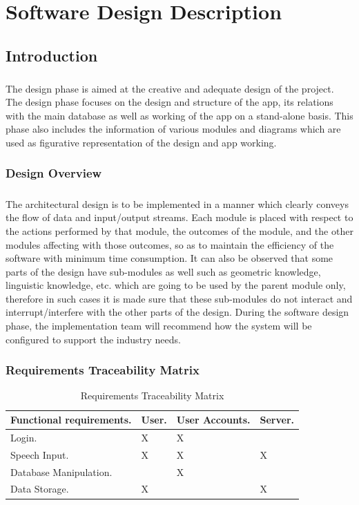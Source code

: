 \chapter{Software Design Description}
\section{Introduction}
\paragraph{}The design phase is aimed at the creative and adequate design of the project. The design phase focuses on the design and structure of the app, its relations with the main database as well as working of the app on a stand-alone basis. This phase also includes the information of various modules and diagrams which are used as figurative representation of the design and app working.
\subsection{Design Overview}\paragraph{}The architectural design is to be implemented in a manner which clearly conveys the flow of data and input/output streams. Each module is placed with respect to the actions performed by that module, the outcomes of the module, and the other modules affecting with those outcomes, so as to maintain the efficiency of the software with minimum time consumption.
It can also be observed that some parts of the design have sub-modules as well such as geometric knowledge, linguistic knowledge, etc. which are going to be used by the parent module only, therefore in such cases it is made sure that these sub-modules do not interact and interrupt/interfere with the other parts of the design. During the software design phase, the implementation team will recommend how the system will be configured to support the industry needs.
\newpage
\subsection{Requirements Traceability Matrix}
  \begin{center}
\begin{table}[h!]
\caption{Requirements Traceability Matrix}
  \centering
  \begin{tabular}{|p{3cm}| p{1.5cm} | p{1.5cm} | p{1.5cm}|}
\hline
    Functional requirements. & User.& User Accounts. & Server.\\
    \hline
    
    Login. &X&X&\\
 \hline
    Speech Input. &X&X&X\\
 \hline
    Database Manipulation.&&X&\\
 \hline
    Data Storage.&X&&X\\
 \hline

  \end{tabular}
\end{table}
\end{center}

